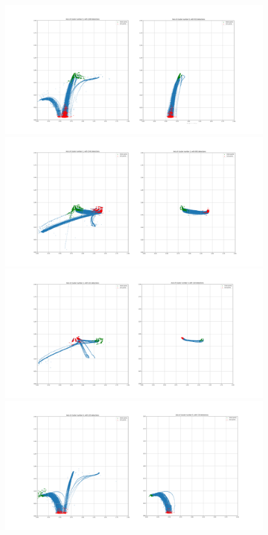 \documentclass[acmtog, authorversion]{acmart}
\begin{document}
\begin{figure}
 \includegraphics[width=1\columnwidth]{clustering/n_cluster_0_before_after.png}

 \includegraphics[width=1\columnwidth]{clustering/n_cluster_2_before_after.png}

 \includegraphics[width=1\columnwidth]{clustering/n_cluster_3_before_after.png}

 \includegraphics[width=1\columnwidth]{clustering/n_cluster_4_before_after.png}


\end{figure}
\end{document}
